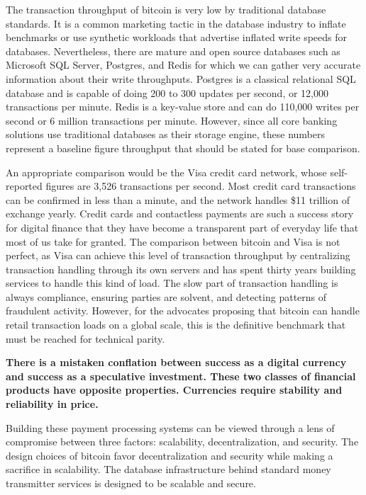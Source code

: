 The transaction throughput of bitcoin is very low by traditional
database standards. It is a common marketing tactic in the database industry to
inflate benchmarks or use synthetic workloads that advertise inflated write
speeds for databases. Nevertheless, there are mature and open source databases
such as Microsoft SQL Server, Postgres, and Redis for which we can gather very
accurate information about their write throughputs.  Postgres is a classical
relational SQL database and is capable of doing 200 to 300 updates per second,
or 12,000 transactions per minute. Redis is a key-value store and can do 110,000
writes per second or 6 million transactions per minute. However, since all core
banking solutions use traditional databases as their storage engine, these
numbers represent a baseline figure throughput that should be stated for base
comparison. \cite{katz_2017}

An appropriate comparison would be the Visa credit card network, whose
self-reported figures are 3,526 transactions per second. Most credit card
transactions can be confirmed in less than a minute, and the network handles
\$11 trillion of exchange yearly. Credit cards and contactless payments are such
a success story for digital finance that they have become a transparent part of
everyday life that most of us take for granted. The comparison between bitcoin
and Visa is not perfect, as Visa can achieve this level of transaction
throughput by centralizing transaction handling through its own servers and has
spent thirty years building services to handle this kind of load. The slow part
of transaction handling is always compliance, ensuring parties are solvent, and
detecting patterns of fraudulent activity. However, for the advocates proposing
that bitcoin can handle retail transaction loads on a global scale, this is the
definitive benchmark that must be reached for technical parity.


\begin{infobox}
 \textbf{
    There is a mistaken conflation between success as a digital currency and
    success as a speculative investment. These two classes of financial
    products have opposite properties. Currencies require stability and
    reliability in price.
  }
\end{infobox}


Building these payment processing systems can be viewed through a lens of
compromise between three factors: scalability, decentralization, and security.
The design choices of bitcoin favor decentralization and security while making a
sacrifice in scalability. The database infrastructure behind standard money
transmitter services is designed to be scalable and secure.

